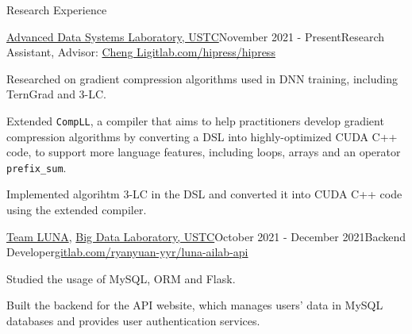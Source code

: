 \documentclass{resume} %
\begin{document}
\begin{rSection}{Research Experience}

    \begin{rSubsection}{\href{http://adsl.ustc.edu.cn/}{Advanced Data Systems Laboratory, USTC}}{November 2021 - Present}{Research Assistant, Advisor: \href{http://staff.ustc.edu.cn/~chengli7/}{Cheng Li}}{\href{https://gitlab.com/hipress/hipress}{gitlab.com/hipress/hipress}}

        \item Researched on gradient compression algorithms used in DNN training, including TernGrad and 3-LC. 
        \item Extended \texttt{CompLL}, a compiler that aims to help practitioners develop gradient compression algorithms by converting a DSL into highly-optimized CUDA C++ code, to support more language features, including loops, arrays and an operator \texttt{prefix\_sum}. 
        \item Implemented algorihtm 3-LC in the DSL and converted it into CUDA C++ code using the extended compiler. 
    \end{rSubsection}


    \begin{rSubsection}{\href{https://luna.bdaa.pro/}{Team LUNA}, \href{http://bigdata.ustc.edu.cn/}{Big Data Laboratory, USTC}}{October 2021 - December 2021}{Backend Developer}{\href{https://gitlab.com/ryanyuan-yyr/luna-ailab-api}{gitlab.com/ryanyuan-yyr/luna-ailab-api}}
        \item Studied the usage of MySQL, ORM and Flask.
        \item Built the backend for the API website, which manages users' data in MySQL databases and provides user authentication services.
    \end{rSubsection}
\end{rSection}
\end{document}
